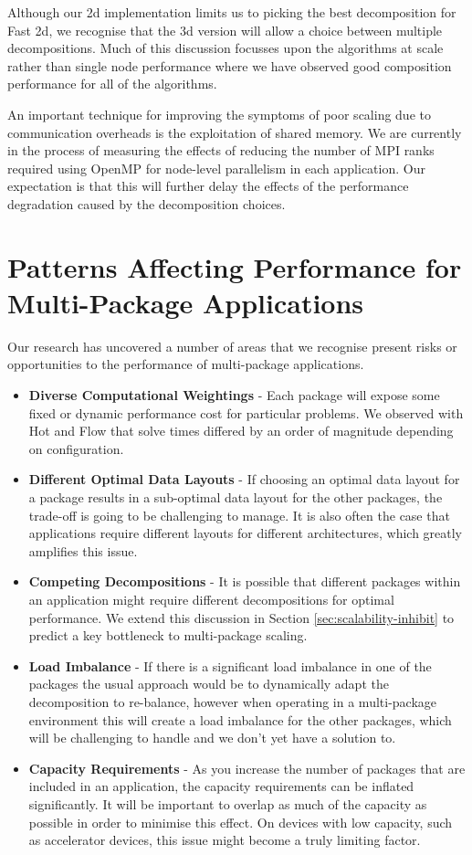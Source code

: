 \documentclass[runningheads,a4paper]{llncs}
\begin{document}
Although our 2d implementation limits us to picking the best decomposition for Fast 2d, we recognise that the 3d version will allow a choice between multiple decompositions. Much of this discussion focusses upon the algorithms at scale rather than single node performance where we have observed good composition performance for all of the algorithms. 

An important technique for improving the symptoms of poor scaling due to communication overheads is the exploitation of shared memory. We are currently in the process of measuring the effects of reducing the number of MPI ranks required using OpenMP for node-level parallelism in each application. Our expectation is that this will further delay the effects of the performance degradation caused by the decomposition choices.

\section{Patterns Affecting Performance for Multi-Package Applications}

Our research has uncovered a number of areas that we recognise present risks or opportunities to the performance of multi-package applications. 

\begin{itemize}
  \item \textbf{Diverse Computational Weightings} - Each package will expose some fixed or dynamic performance cost for particular problems. We observed with Hot and Flow that solve times differed by an order of magnitude depending on configuration.
  \item \textbf{Different Optimal Data Layouts} - If choosing an optimal data layout for a package results in a sub-optimal data layout for the other packages, the trade-off is going to be challenging to manage. It is also often the case that applications require different layouts for different architectures, which greatly amplifies this issue. 
  \item \textbf{Competing Decompositions} - It is possible that different packages within an application might require different decompositions for optimal performance. We extend this discussion in Section \ref{sec:scalability-inhibit} to predict a key bottleneck to multi-package scaling.
  \item \textbf{Load Imbalance} - If there is a significant load imbalance in one of the packages the usual approach would be to dynamically adapt the decomposition to re-balance, however when operating in a multi-package environment this will create a load imbalance for the other packages, which will be challenging to handle and we don't yet have a solution to.
  \item \textbf{Capacity Requirements} - As you increase the number of packages that are included in an application, the capacity requirements can be inflated significantly. It will be important to overlap as much of the capacity as possible in order to minimise this effect. On devices with low capacity, such as accelerator devices, this issue might become a truly limiting factor.
\end{itemize}
\end{document}
